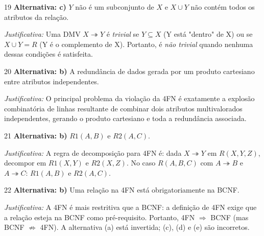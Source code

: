 \documentclass[12pt]{article}
\begin{document}
\vspace{0.5cm}

\begin{gabbox}{19}
\textbf{Alternativa: c)} $Y$ não é um subconjunto de $X$ e $X \cup Y$ não contém todos os atributos da relação.

\smallskip
\textit{Justificativa:} Uma DMV $X \twoheadrightarrow Y$ é \emph{trivial} se $Y \subseteq X$ (Y está "dentro" de X) ou se $X \cup Y = R$ (Y é o complemento de X). Portanto, é \emph{não trivial} quando nenhuma dessas condições é satisfeita.
\end{gabbox}

\vspace{0.5cm}

\begin{gabbox}{20}
\textbf{Alternativa: b)} A redundância de dados gerada por um produto cartesiano entre atributos independentes.

\smallskip
\textit{Justificativa:} O principal problema da violação da 4FN é exatamente a explosão combinatória de linhas resultante de combinar dois atributos multivalorados independentes, gerando o produto cartesiano e toda a redundância associada.
\end{gabbox}

\vspace{0.5cm}

\begin{gabbox}{21}
\textbf{Alternativa: b)} $R1(A, B)$ e $R2(A, C)$.

\smallskip
\textit{Justificativa:} A regra de decomposição para 4FN é: dada $X \twoheadrightarrow Y$ em $R(X, Y, Z)$, decompor em $R1(X, Y)$ e $R2(X, Z)$. No caso $R(A, B, C)$ com $A \twoheadrightarrow B$ e $A \twoheadrightarrow C$: $R1(A, B)$ e $R2(A, C)$.
\end{gabbox}

\vspace{0.5cm}

\begin{gabbox}{22}
\textbf{Alternativa: b)} Uma relação na 4FN está obrigatoriamente na BCNF.

\smallskip
\textit{Justificativa:} A 4FN é mais restritiva que a BCNF: a definição de 4FN exige que a relação esteja na BCNF como pré-requisito. Portanto, 4FN $\Rightarrow$ BCNF (mas BCNF $\not\Rightarrow$ 4FN). A alternativa (a) está invertida; (c), (d) e (e) são incorretos.
\end{gabbox}
\end{document}
